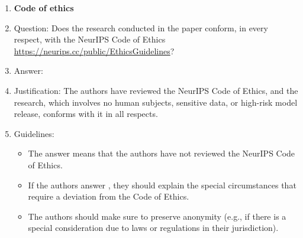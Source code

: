 \begin{enumerate}
\item {\bf Code of ethics}
    \item[] Question: Does the research conducted in the paper conform, in every respect, with the NeurIPS Code of Ethics \url{https://neurips.cc/public/EthicsGuidelines}?
    \item[] Answer: \answerYes{}
    \item[] Justification: The authors have reviewed the NeurIPS Code of Ethics, and the research, which involves no human subjects, sensitive data, or high-risk model release, conforms with it in all respects.
    \item[] Guidelines:
    \begin{itemize}
        \item The answer \answerNA{} means that the authors have not reviewed the NeurIPS Code of Ethics.
        \item If the authors answer \answerNo, they should explain the special circumstances that require a deviation from the Code of Ethics.
        \item The authors should make sure to preserve anonymity (e.g., if there is a special consideration due to laws or regulations in their jurisdiction).
    \end{itemize}



\end{enumerate}
